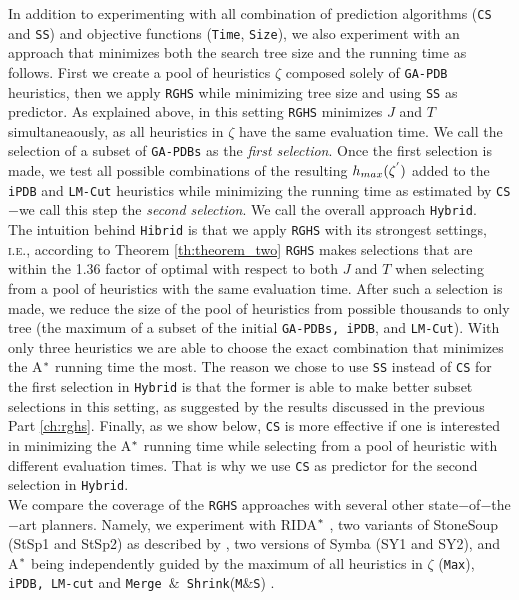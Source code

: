 In addition to experimenting with all combination of prediction algorithms (\texttt{CS} and \texttt{SS}) and objective functions (\texttt{Time}, \texttt{Size}), we also experiment with an approach that minimizes both the search tree size and the running time as follows. First we create a pool of heuristics $\zeta$ composed solely of \texttt{GA-PDB} heuristics, then we apply \texttt{RGHS} while minimizing tree size and using \texttt{SS} as predictor. As explained above, in this setting \texttt{RGHS} minimizes $J$ and $T$ simultaneaously, as all heuristics in $\zeta$ have the same evaluation time. We call the selection of a subset of \texttt{GA-PDBs} as the \textit{first selection}. Once the first selection is made, we test all possible combinations of the resulting $h_{max}(\zeta\sp{'})$ added to the \texttt{iPDB} and \texttt{LM-Cut} heuristics while minimizing the running time as estimated by \texttt{CS}$-$we call this step the \textit{second selection}. We call the overall approach \texttt{Hybrid}.\\

The intuition behind \texttt{Hibrid} is that we apply \texttt{RGHS} with its strongest settings, \textsc{i.e.,} according to Theorem \ref{th:theorem_two} \texttt{RGHS} makes selections that are within the 1.36 factor of optimal with respect to both $J$ and $T$ when selecting from a pool of heuristics with the same evaluation time. After such a selection is made, we reduce the size of the pool of heuristics from possible thousands to only tree (the maximum of a subset of the initial \texttt{GA-PDBs, iPDB}, and \texttt{LM-Cut}). With only three heuristics we are able to choose the exact combination that minimizes the A$\sp{*}$ running time the most. The reason we chose to use \texttt{SS} instead of \texttt{CS} for the first selection in \texttt{Hybrid} is that the former is able to make better subset selections in this setting, as suggested by the results discussed in the previous Part \ref{ch:rghs}. Finally, as we show below, \texttt{CS} is more effective if one is interested in minimizing the A$\sp{*}$ running time while selecting from a pool of heuristic with different evaluation times. That is why we use \texttt{CS} as predictor for the second selection in \texttt{Hybrid}.\\

We compare the coverage of the \texttt{RGHS} approaches with several other state$-$of$-$the$-$art planners. Namely, we experiment with RIDA$\sp{*}$ \cite{BarleySantiagoOver}, two variants of StoneSoup (StSp1 and StSp2) as described by \cite{nissim2011computing}, two versions of Symba (SY1 and SY2), and A$\sp{*}$ being independently guided by the maximum of all heuristics in $\zeta$ (\texttt{Max}), \texttt{iPDB, LM-cut} and \texttt{Merge $\&$ Shrink}(\texttt{M$\&$S}) \cite{nissim2011computing}.\\

